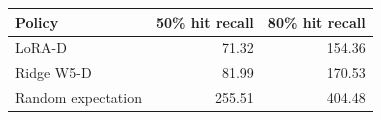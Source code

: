 {\small\setlength{\tabcolsep}{4pt}
\begin{tabularx}{\textwidth}{Xrr}
\toprule
Policy & 50\% hit recall & 80\% hit recall \\
\midrule
LoRA-D & 71.32 & 154.36 \\
Ridge W5-D & 81.99 & 170.53 \\
Random expectation & 255.51 & 404.48 \\
\bottomrule
\end{tabularx}}
